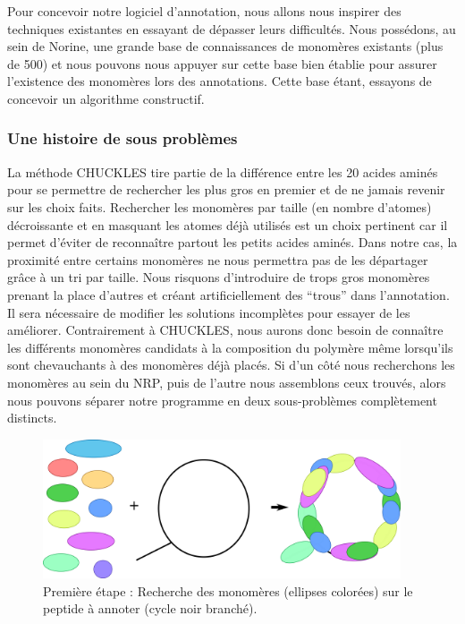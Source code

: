 Pour concevoir notre logiciel d'annotation, nous allons nous inspirer des techniques existantes en essayant de dépasser leurs difficultés.
Nous possédons, au sein de Norine, une grande base de connaissances de monomères existants (plus de 500) et nous pouvons nous appuyer sur cette base bien établie pour assurer l'existence des monomères lors des annotations.
Cette base étant, essayons de concevoir un algorithme constructif.


\subsubsection{Une histoire de sous problèmes}

La méthode CHUCKLES tire partie de la différence entre les 20 acides aminés pour se permettre de rechercher les plus gros en premier et de ne jamais revenir sur les choix faits.
Rechercher les monomères par taille (en nombre d'atomes) décroissante et en masquant les atomes déjà utilisés est un choix pertinent car il permet d'éviter de reconnaître partout les petits acides aminés.
Dans notre cas, la proximité entre certains monomères ne nous permettra pas de les départager grâce à un tri par taille.
Nous risquons d'introduire de trops gros monomères prenant la place d'autres et créant artificiellement des ``trous'' dans l'annotation.
Il sera nécessaire de modifier les solutions incomplètes pour essayer de les améliorer.
Contrairement à CHUCKLES, nous aurons donc besoin de connaître les différents monomères candidats à la composition du polymère même lorsqu'ils sont chevauchants à des monomères déjà placés.
Si d'un côté nous recherchons les monomères au sein du NRP, puis de l'autre nous assemblons ceux trouvés, alors nous pouvons séparer notre programme en deux sous-problèmes complètement distincts.

\begin{figure}[!ht]
  \begin{center}
    \includegraphics[width=400px]{Figures/s2m/Intro/searching.png}
    \caption{\label{search_fig}Première étape : Recherche des monomères (ellipses colorées) sur le peptide à annoter (cycle noir branché).}
  \end{center}
\end{figure}

